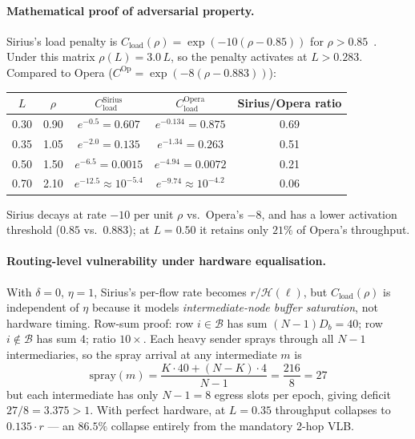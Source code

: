 \documentclass{article}
\begin{document}
    \paragraph{Mathematical proof of adversarial property.}  Sirius's load penalty is $C_{\text{load}}(\rho) = \exp(-10(\rho-0.85))$ for $\rho > 0.85$~\cite{sirius}.  Under this matrix $\rho(L) = 3.0\,L$, so the penalty activates at $L > 0.283$.  Compared to Opera ($C^{\text{Op}} = \exp(-8(\rho - 0.883))$):

    \begin{center}
    \begin{tabular}{|c|c|c|c|c|}
        \hline
        $L$ & $\rho$ & $C_{\text{load}}^{\text{Sirius}}$ & $C_{\text{load}}^{\text{Opera}}$ & \textbf{Sirius/Opera ratio} \\
        \hline
        0.30 & 0.90 & $e^{-0.5} = 0.607$ & $e^{-0.134} = 0.875$ & 0.69 \\
        0.35 & 1.05 & $e^{-2.0} = 0.135$ & $e^{-1.34} = 0.263$ & 0.51 \\
        0.50 & 1.50 & $e^{-6.5} = 0.0015$ & $e^{-4.94} = 0.0072$ & 0.21 \\
        0.70 & 2.10 & $e^{-12.5} \approx 10^{-5.4}$ & $e^{-9.74} \approx 10^{-4.2}$ & 0.06 \\
        \hline
    \end{tabular}
    \end{center}

    Sirius decays at rate $-10$ per unit $\rho$ vs.\ Opera's $-8$, and has a lower activation threshold ($0.85$ vs.\ $0.883$); at $L=0.50$ it retains only $21\%$ of Opera's throughput.

    \paragraph{Routing-level vulnerability under hardware equalisation.}
    With $\delta=0$, $\eta=1$, Sirius's per-flow rate becomes $r/\mathcal{H}(\ell)$, but $C_{\text{load}}(\rho)$ is independent of $\eta$ because it models \emph{intermediate-node buffer saturation}, not hardware timing.  Row-sum proof: row $i\in\mathcal{B}$ has sum $(N{-}1)D_b = 40$; row $i\notin\mathcal{B}$ has sum $4$; ratio $10\times$.  Each heavy sender sprays through all $N{-}1$ intermediaries, so the spray arrival at any intermediate $m$ is
    \[
        \text{spray}(m) = \frac{K\cdot 40 + (N{-}K)\cdot 4}{N{-}1} = \frac{216}{8} = 27
    \]
    but each intermediate has only $N{-}1 = 8$ egress slots per epoch, giving deficit $27/8 = 3.375 > 1$.  With perfect hardware, at $L=0.35$ throughput collapses to $0.135\cdot r$ --- an $86.5\%$ collapse entirely from the mandatory 2-hop VLB.
\end{document}
